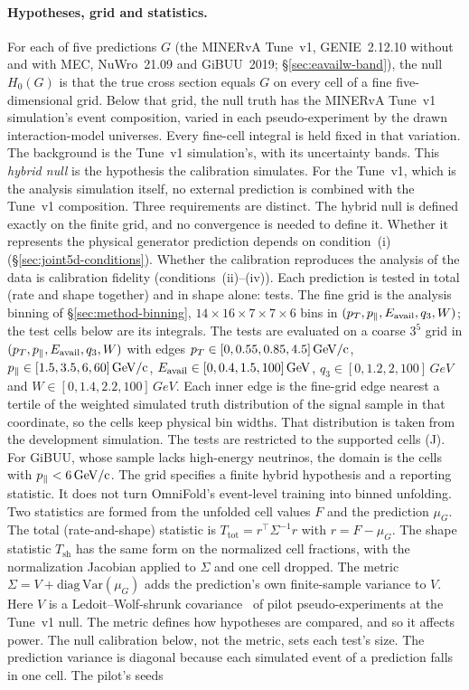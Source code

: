 \paragraph{Hypotheses, grid and statistics.} For each of five predictions $G$ (the MINERvA Tune~v1, GENIE~2.12.10 without and with MEC, NuWro~21.09 and GiBUU~2019; \S\ref{sec:eavailw-band}), the null $H_{0}(G)$ is that the true cross section equals $G$ on every cell of a fine five-dimensional grid. Below that grid, the null truth has the MINERvA Tune~v1 simulation's event composition, varied in each pseudo-experiment by the drawn interaction-model universes. Every fine-cell integral is held fixed in that variation. The background is the Tune~v1 simulation's, with its uncertainty bands. This \emph{hybrid null} is the hypothesis the calibration simulates. For the Tune~v1, which is the analysis simulation itself, no external prediction is combined with the Tune~v1 composition. Three requirements are distinct. The hybrid null is defined exactly on the finite grid, and no convergence is needed to define it. Whether it represents the physical generator prediction depends on condition~(i) (\S\ref{sec:joint5d-conditions}). Whether the calibration reproduces the analysis of the data is calibration fidelity (conditions~(ii)--(iv)). Each prediction is tested in total (rate and shape together) and in shape alone: \jtNtests{} tests. The fine grid is the analysis binning of \S\ref{sec:method-binning}, $14\times16\times7\times7\times6$ bins in $(\pT,\pPar,\Eavail,q_{3},W)$; the test cells below are its integrals. The tests are evaluated on a coarse $3^{5}$ grid in $(\pT,\pPar,\Eavail,q_{3},W)$ with edges $\pT\in[0,0.55,0.85,4.5]\,\si{GeV/c}$, $\pPar\in[1.5,3.5,6,60]\,\si{GeV/c}$, $\Eavail\in[0,0.4,1.5,100]\,\si{GeV}$, $q_{3}\in[0,1.2,2,100]\,\si{GeV}$ and $W\in[0,1.4,2.2,100]\,\si{GeV}$. Each inner edge is the fine-grid edge nearest a tertile of the weighted simulated truth distribution of the signal sample in that coordinate, so the cells keep physical bin widths. That distribution is taken from the development simulation. The tests are restricted to the \jtNcells{} supported cells (J). For GiBUU, whose sample lacks high-energy neutrinos, the domain is the \jtNcellsGiBUU{} cells with $\pPar<\SI{6}{GeV/c}$. The grid specifies a finite hybrid hypothesis and a reporting statistic. It does not turn OmniFold's event-level training into binned unfolding. Two statistics are formed from the unfolded cell values $F$ and the prediction $\mu_{G}$. The total (rate-and-shape) statistic is $T_{\mathrm{tot}}=r^{\top}\Sigma^{-1}r$ with $r=F-\mu_{G}$. The shape statistic $T_{\mathrm{sh}}$ has the same form on the normalized cell fractions, with the normalization Jacobian applied to $\Sigma$ and one cell dropped. The metric $\Sigma=V+\mathrm{diag}\,\mathrm{Var}(\mu_{G})$ adds the prediction's own finite-sample variance to $V$. Here $V$ is a Ledoit--Wolf-shrunk covariance~\cite{LedoitWolf:2004} of \jtVn{} pilot pseudo-experiments at the Tune~v1 null. The metric defines how hypotheses are compared, and so it affects power. The null calibration below, not the metric, sets each test's size. The prediction variance is diagonal because each simulated event of a prediction falls in one cell. The pilot's seeds 
